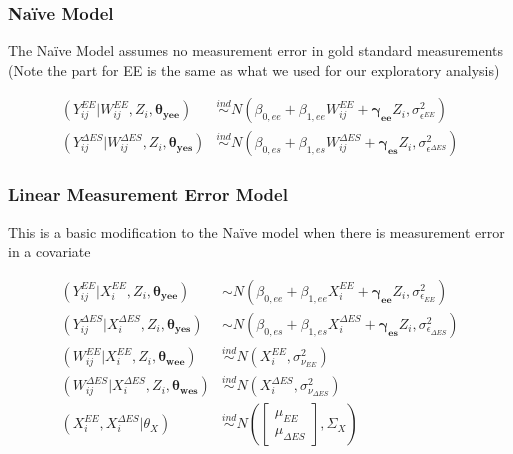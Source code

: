 \documentclass[handout]{beamer}\usepackage[]{graphicx}\usepackage[]{color}
\begin{document}
\begin{frame}
\frametitle{Na{\"i}ve Model}

The Na{\"i}ve Model assumes no measurement error in gold standard measurements (Note the part for EE is the same as what we used for our exploratory analysis) \\

\vspace{1cm}

\begin{align*}
  (Y_{ij}^{EE} | W_{ij}^{EE},Z_i,\boldsymbol{\theta_{yee}}) &\overset{ind}{\sim} N(\beta_{0,ee} + \beta_{1,ee}W_{ij}^{EE}+ \boldsymbol{\gamma_{ee}}Z_i,\sigma_{\epsilon^{EE}}^2) \\
  (Y_{ij}^{\Delta ES} | W_{ij}^{\Delta ES},Z_i,\boldsymbol{\theta_{yes}}) &\overset{ind}{\sim} N(\beta_{0,es} + \beta_{1,es}W_{ij}^{\Delta ES}+ \boldsymbol{\gamma_{es}}Z_i,\sigma_{\epsilon^{\Delta ES}}^2)
\end{align*}

\end{frame}


\begin{frame}
\frametitle{Linear Measurement Error Model}
This is a basic modification to the Na{\"i}ve model when there is measurement error in a covariate

\begin{align*}
  (Y_{ij}^{EE}|X_i^{EE}, Z_i,\boldsymbol{\theta_{yee}}) &\sim N(\beta_{0,ee} + \beta_{1,ee}X_i^{EE} + \boldsymbol{\gamma_{ee}}Z_i, \sigma_{\epsilon_{EE}}^2) \\
  (Y_{ij}^{\Delta ES}|X_i^{\Delta ES}, Z_i,\boldsymbol{\theta_{yes}}) &\sim N(\beta_{0,es} + \beta_{1,es}X_i^{\Delta ES} +  \boldsymbol{\gamma_{es}}Z_i, \sigma_{\epsilon_{\Delta ES}}^2) \\
  (W_{ij}^{EE}|X_i^{EE}, Z_i,\boldsymbol{\theta_{wee}}) &\overset{ind}{\sim} N(X_i^{EE}, \sigma_{\nu_{EE}}^2 ) \\
  (W_{ij}^{\Delta ES}|X_i^{\Delta ES}, Z_i,\boldsymbol{\theta_{wes}}) &\overset{ind}{\sim} N(X_i^{\Delta ES}, \sigma_{\nu_{\Delta ES}}^2 )  \\
  (X_i^{EE},X_i^{\Delta ES}|\theta_X) &\overset{ind}{\sim} N\left(
  \begin{bmatrix}
  \mu_{EE}\\
  \mu_{\Delta ES}
  \end{bmatrix}
  , \Sigma_X
  \right)
\end{align*}

\end{frame}
\end{document}
